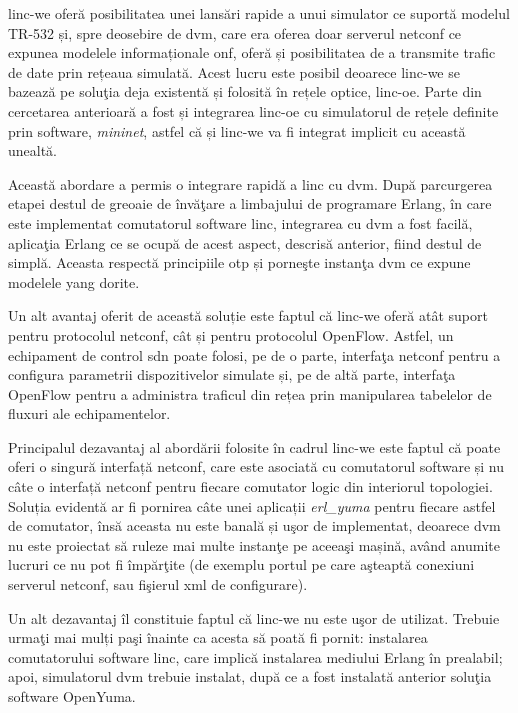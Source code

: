 \gls{linc-we} oferă posibilitatea unei lansări rapide a unui simulator ce suportă modelul TR-532 și, spre deosebire de \gls{dvm}, care era oferea doar serverul \gls{netconf} ce expunea modelele informaționale \gls{onf}, oferă și posibilitatea de a transmite trafic de date prin rețeaua simulată. Acest lucru este posibil deoarece \gls{linc-we} se bazează pe soluţia deja existentă și folosită în rețele optice, \gls{linc-oe}. Parte din cercetarea anterioară a fost și integrarea \gls{linc-oe} cu simulatorul de rețele definite prin software, \textit{mininet}, astfel că și \gls{linc-we} va fi integrat implicit cu această unealtă.

Această abordare a permis o integrare rapidă a \gls{linc} cu \gls{dvm}. După parcurgerea etapei destul de greoaie de învăţare a limbajului de programare Erlang, în care este implementat comutatorul software \gls{linc}, integrarea cu \gls{dvm} a fost facilă, aplicaţia Erlang ce se ocupă de acest aspect, descrisă anterior, fiind destul de simplă. Aceasta respectă principiile \gls{otp} și porneşte instanţa \gls{dvm} ce expune modelele \gls{yang} dorite.

Un alt avantaj oferit de această soluție este faptul că \gls{linc-we} oferă atât suport pentru protocolul \gls{netconf}, cât și pentru protocolul OpenFlow. Astfel, un echipament de control \gls{sdn} poate folosi, pe de o parte, interfaţa \gls{netconf} pentru a configura parametrii dispozitivelor simulate și, pe de altă parte, interfaţa OpenFlow pentru a administra traficul din rețea prin manipularea tabelelor de fluxuri ale echipamentelor.

Principalul dezavantaj al abordării folosite în cadrul \gls{linc-we} este faptul că poate oferi o singură interfață \gls{netconf}, care este asociată cu comutatorul software și nu câte o interfață \gls{netconf} pentru fiecare comutator logic din interiorul topologiei. Soluția evidentă ar fi pornirea câte unei aplicații \textit{erl\_yuma} pentru fiecare astfel de comutator, însă aceasta nu este banală și uşor de implementat, deoarece \gls{dvm} nu este proiectat să ruleze mai multe instanţe pe aceeaşi mașină, având anumite lucruri ce nu pot fi împărţite (de exemplu portul pe care aşteaptă conexiuni serverul \gls{netconf}, sau fişierul \gls{xml} de configurare).

Un alt dezavantaj îl constituie faptul că \gls{linc-we} nu este uşor de utilizat. Trebuie urmaţi mai mulți paşi înainte ca acesta să poată fi pornit: instalarea comutatorului software \gls{linc}, care implică instalarea mediului Erlang în prealabil; apoi, simulatorul \gls{dvm} trebuie instalat, după ce a fost instalată anterior soluţia software OpenYuma.

